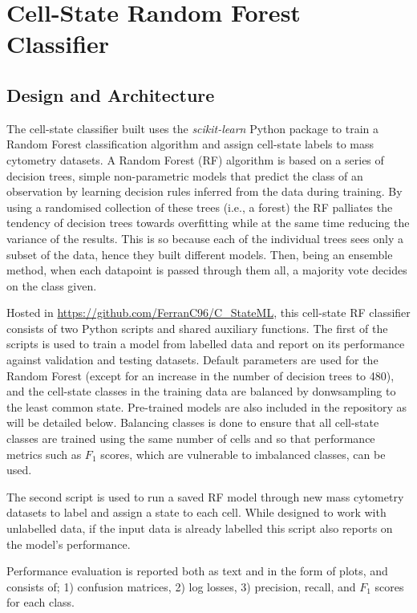 \newpage
\section{Cell-State Random Forest Classifier}

\subsection{Design and Architecture}

The cell-state classifier built uses the \emph{scikit-learn} Python package \cite{pedregosa_scikit-learn_2011} to train a Random Forest classification algorithm and assign cell-state labels to mass cytometry datasets. A Random Forest (RF) algorithm is based on a series of decision trees, simple non-parametric models that predict the class of an observation by learning decision rules inferred from the data during training. By using a randomised collection of these trees (i.e., a forest) the RF palliates the tendency of decision trees towards overfitting while at the same time reducing the variance of the results. This is so because each of the individual trees sees only a subset of the data, hence they built different models. Then, being an ensemble method, when each datapoint is passed through them all, a majority vote decides on the class given.

Hosted in \url{https://github.com/FerranC96/C\_StateML}, this cell-state RF classifier consists of two Python scripts and shared auxiliary functions. 
The first of the scripts is used to train a model from labelled data and report on its performance against validation and testing datasets. Default parameters are used for the Random Forest (except for an increase in the number of decision trees to 480), and the cell-state classes in the training data are balanced by donwsampling to the least common state. Pre-trained models are also included in the repository as will be detailed below.
Balancing classes is done to ensure that all cell-state classes are trained using the same number of cells and so that performance metrics such as $F_1$ scores, which are vulnerable to imbalanced classes, can be used.

The second script is used to run a saved RF model through new mass cytometry datasets to label and assign a state to each cell. While designed to work with unlabelled data, if the input data is already labelled this script also reports on the model's performance. 

Performance evaluation is reported both as text and in the form of plots, and consists of; 1) confusion matrices, 2) log losses, 3) precision, recall, and $F_1$ scores for each class. 


